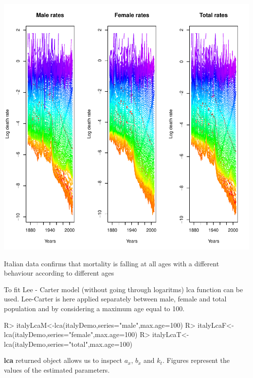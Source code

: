 \documentclass[nojss]{jss}
\begin{document}
\includegraphics{mortality_projection-italyDemoFigTime}

Italian data confirms that mortality is falling at all ages with a different behaviour according to different ages

To fit Lee - Carter model (without going through logaritms) lca function can be used. Lee-Carter is here applied separately between male, female and total population and by considering a maximum age equal to 100.

\begin{Schunk}
\begin{Sinput}
R> italyLcaM<-lca(italyDemo,series="male",max.age=100)
R> italyLcaF<-lca(italyDemo,series="female",max.age=100)
R> italyLcaT<-lca(italyDemo,series="total",max.age=100)
\end{Sinput}
\end{Schunk}

\textbf{lca} returned object allows us to inspect $a_x$, $b_x$ and $k_t$. Figures represent the values of the estimated parameters. 
\end{document}
